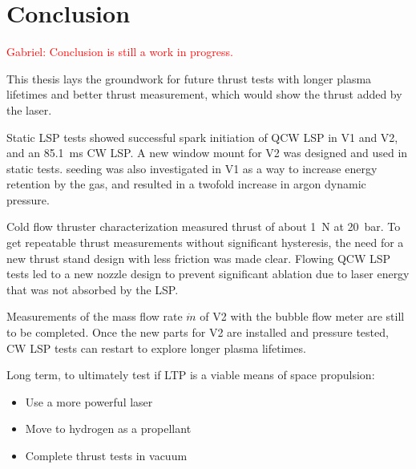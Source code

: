 \chapter{Conclusion}

    \textcolor{red}{Gabriel: Conclusion is still a work in progress.}

    This thesis lays the groundwork for future thrust tests with longer plasma lifetimes and better thrust measurement, which would show the thrust added by the laser.

    Static LSP tests showed successful spark initiation of QCW LSP in V1 and V2, and an \qty{85.1}{ms} CW LSP. A new window mount for V2 was designed and used in static tests.  seeding was also investigated in V1 as a way to increase energy retention by the gas, and resulted in a twofold increase in argon dynamic pressure. 

    Cold flow thruster characterization measured thrust of about \qty{1}{N} at \qty{20}{bar}. To get repeatable thrust measurements without significant hysteresis, the need for a new thrust stand design with less friction was made clear. Flowing QCW LSP tests led to a new nozzle design to prevent significant ablation due to laser energy that was not absorbed by the LSP. 
    
    Measurements of the mass flow rate $\dot m$ of V2 with the bubble flow meter are still to be completed. Once the new parts for V2 are installed and pressure tested, CW LSP tests can restart to explore longer plasma lifetimes.

    Long term, to ultimately test if LTP is a viable means of space propulsion:
    \begin{itemize}
        \item Use a more powerful laser
        \item Move to hydrogen as a propellant
        \item Complete thrust tests in vacuum
    \end{itemize}